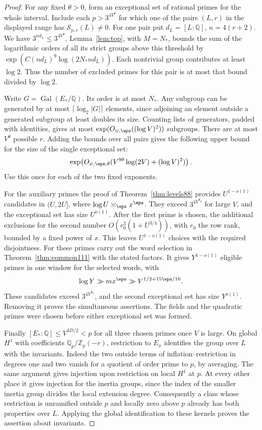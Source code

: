 \documentclass[a4paper,11pt]{article}
\theoremstyle{definition}
\theoremstyle{remark}
\numberwithin{equation}{section}
\newcommand{\Sel}{\mathcal S}
\begin{document}
\begin{proof}
For any fixed \(\theta>0\), form an exceptional set of rational primes
for the whole interval. Include each \(p>3^{4V^\theta}\) for which
one of the pairs \((L,r)\) in the displayed range has
\(\Sel_{p,r}(L)\ne0\). For one pair put \(d_L=[L:\mathbb Q]\),
\(n=4(r+2)\). We have \(3^{nd_L}\le3^{4V^\theta}\).
Lemma~\ref{lem:top}, with \(M=N_*\), bounds the sum of the logarithmic
orders of all its strict groups above this threshold by
\(\exp(C(nd_L)^9\log(2N_*nd_L))\). Each nontrivial group contributes
at least \(\log2\). Thus the number of excluded primes for this pair
is at most that bound divided by \(\log2\).

Write \(G=\operatorname{Gal}(E_*/\mathbb Q)\).
Its order is at most \(N_*\). Any subgroup can be generated by at
most \(\lceil\log_2|G|\rceil\) elements, since adjoining an element
outside a generated subgroup at least doubles its size.
Counting lists of generators, padded with identities, gives at most
\(\exp(O_{\psi,\eps}((\log V)^2))\) subgroups. There are at most
\(V^\theta\) possible \(r\). Adding the bounds over all pairs gives
the following upper bound for the size of the single exceptional set:
\[
 \exp\!\left(O_{\psi,\eps,\theta}
       (V^{9\theta}\log(2V)+(\log V)^2)\right).
\]
Use this once for each of the two fixed exponents.

For the auxiliary primes the proof of Theorem~\ref{thm:levels88}
provides \(U^{1-o(1)}\) candidates in \((U,2U]\), where
\(\log U\asymp_\eps x^\eps\). They exceed \(3^{4V^{\theta_g}}\)
for large \(V\), and the exceptional set has size \(U^{o(1)}\).
After the first prime is chosen, the additional exclusions for the
second number \(O(r_0^3(1+U^{3/4}))\), with \(r_0\) the row rank,
bounded by a fixed power of \(x\). This leaves \(U^{1-o(1)}\) choices
with the required disjointness. For these primes carry out the word
selection in Theorem~\ref{thm:common111} with the stated factors.
It gives \(Y^{1-o(1)}\) eligible primes in one window for the
selected words, with
\[
 \log Y\gg m x^\eps\gg V^{1/2+15\eps/16}.
\]
These candidates exceed \(3^{4V^{\theta_T}}\), and the second
exceptional set has size \(Y^{o(1)}\). Removing it proves the
simultaneous assertions. The fields and the quadratic primes were
chosen before either exceptional set was formed.

Finally \([E_*:\mathbb Q]\le V^{3D/2}<p\) for all three chosen
primes once \(V\) is large. On global \(H^1\) with coefficients
\(\mathbb Q_p/\mathbb Z_p(-r)\), restriction to \(E_x\) identifies
the group over \(L\) with the invariants. Indeed the two outside
terms of inflation--restriction in degrees one and two vanish for
a quotient of order prime to \(p\), by averaging. The same argument
gives injection upon restriction on local \(H^1\) at \(p\).
At every other place it gives injection for the inertia groups,
since the index of the smaller inertia group divides the local
extension degree. Consequently a class whose restriction is
unramified outside \(p\) and locally zero above \(p\) already has
both properties over \(L\). Applying the global identification to
these kernels proves the assertion about invariants.
\end{proof}
\end{document}
